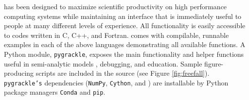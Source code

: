 \grackle{} has been designed to maximize scientific productivity on
high performance computing systems while maintaining an interface that
is immediately useful to people at many different levels of
experience.
All functionality is easily accessible to codes written
in C, C++, and Fortran.  \grackle{} comes with compilable,
runnable examples in each of the above languages demonstrating all
available functions.  A Python module, \texttt{pygrackle},
exposes the main functionality and helper functions useful in
semi-analytic models \citep[e.g.,][]{2016ApJ...820...71C,
  2016MNRAS.459.4209A}, debugging, and education.  Sample
figure-producing scripts are included in the source (see Figure
\ref{fig:freefall}). \texttt{pygrackle's}
dependencies (\texttt{NumPy}, \texttt{Cython}, and \yt{}) are
installable by Python package managers \texttt{Conda}
and \texttt{pip}.




